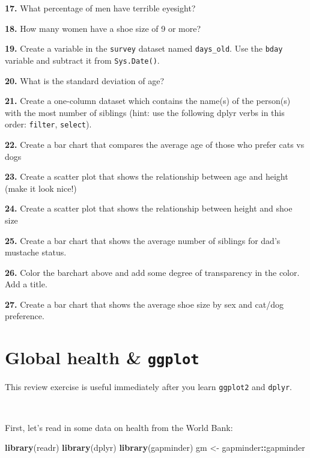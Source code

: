 \documentclass[]{book}
\newenvironment{Shaded}{\begin{snugshade}}{\end{snugshade}}
\newcommand{\KeywordTok}[1]{\textcolor[rgb]{0.13,0.29,0.53}{\textbf{#1}}}
\newcommand{\NormalTok}[1]{#1}
\newcommand{\OperatorTok}[1]{\textcolor[rgb]{0.81,0.36,0.00}{\textbf{#1}}}
\newcommand{\StringTok}[1]{\textcolor[rgb]{0.31,0.60,0.02}{#1}}
\begin{document}
\textbf{17.} What percentage of men have terrible eyesight?

\textbf{18.} How many women have a shoe size of 9 or more?

\textbf{19.} Create a variable in the \texttt{survey} dataset named \texttt{days\_old}. Use the \texttt{bday} variable and subtract it from \texttt{Sys.Date()}.

\textbf{20.} What is the standard deviation of age?

\textbf{21.} Create a one-column dataset which contains the name(s) of the person(s) with the most number of siblings (hint: use the following dplyr verbs in this order: \texttt{filter}, \texttt{select}).

\textbf{22.} Create a bar chart that compares the average age of those who prefer cats vs dogs

\textbf{23.} Create a scatter plot that shows the relationship between age and height (make it look nice!)

\textbf{24.} Create a scatter plot that shows the relationship between height and shoe size

\textbf{25.} Create a bar chart that shows the average number of siblings for dad's mustache status.

\textbf{26.} Color the barchart above and add some degree of transparency in the color. Add a title.

\textbf{27.} Create a bar chart that shows the average shoe size by sex and cat/dog preference.

\hypertarget{global-health-ggplot}{%
\chapter{\texorpdfstring{Global health \& \texttt{ggplot}}{Global health \& ggplot}}\label{global-health-ggplot}}

This review exercise is useful immediately after you learn \texttt{ggplot2} and \texttt{dplyr}.

~

First, let's read in some data on health from the World Bank:

\begin{Shaded}
\begin{Highlighting}[]
\KeywordTok{library}\NormalTok{(readr)}
\KeywordTok{library}\NormalTok{(dplyr)}
\KeywordTok{library}\NormalTok{(gapminder)}
\NormalTok{gm <-}\StringTok{ }\NormalTok{gapminder}\OperatorTok{::}\NormalTok{gapminder}
\end{Highlighting}
\end{Shaded}
\end{document}
